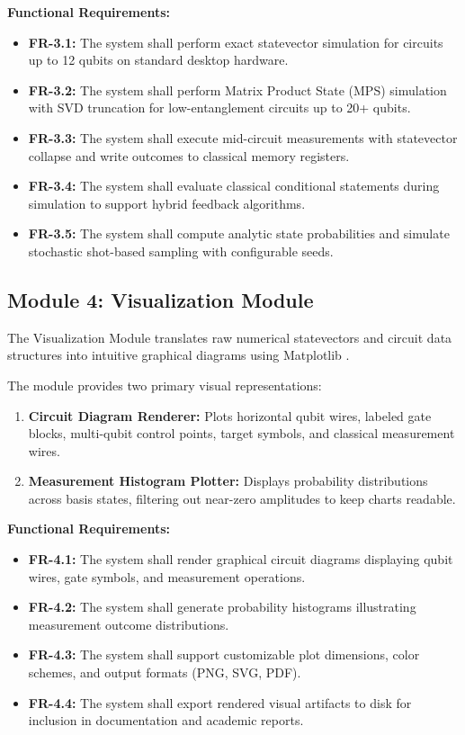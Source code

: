 \textbf{Functional Requirements:}
\begin{itemize}[leftmargin=*]
    \item \textbf{FR-3.1:} The system shall perform exact statevector simulation for circuits up to 12 qubits on standard desktop hardware.
    \item \textbf{FR-3.2:} The system shall perform Matrix Product State (MPS) simulation with SVD truncation for low-entanglement circuits up to 20+ qubits.
    \item \textbf{FR-3.3:} The system shall execute mid-circuit measurements with statevector collapse and write outcomes to classical memory registers.
    \item \textbf{FR-3.4:} The system shall evaluate classical conditional statements during simulation to support hybrid feedback algorithms.
    \item \textbf{FR-3.5:} The system shall compute analytic state probabilities and simulate stochastic shot-based sampling with configurable seeds.
\end{itemize}

\subsection{Module 4: Visualization Module}

The Visualization Module translates raw numerical statevectors and circuit data structures into intuitive graphical diagrams using Matplotlib \cite{matplotlib2007}.

The module provides two primary visual representations:
\begin{enumerate}
    \item \textbf{Circuit Diagram Renderer:} Plots horizontal qubit wires, labeled gate blocks, multi-qubit control points, target symbols, and classical measurement wires.
    \item \textbf{Measurement Histogram Plotter:} Displays probability distributions across basis states, filtering out near-zero amplitudes to keep charts readable.
\end{enumerate}

\textbf{Functional Requirements:}
\begin{itemize}[leftmargin=*]
    \item \textbf{FR-4.1:} The system shall render graphical circuit diagrams displaying qubit wires, gate symbols, and measurement operations.
    \item \textbf{FR-4.2:} The system shall generate probability histograms illustrating measurement outcome distributions.
    \item \textbf{FR-4.3:} The system shall support customizable plot dimensions, color schemes, and output formats (PNG, SVG, PDF).
    \item \textbf{FR-4.4:} The system shall export rendered visual artifacts to disk for inclusion in documentation and academic reports.
\end{itemize}

